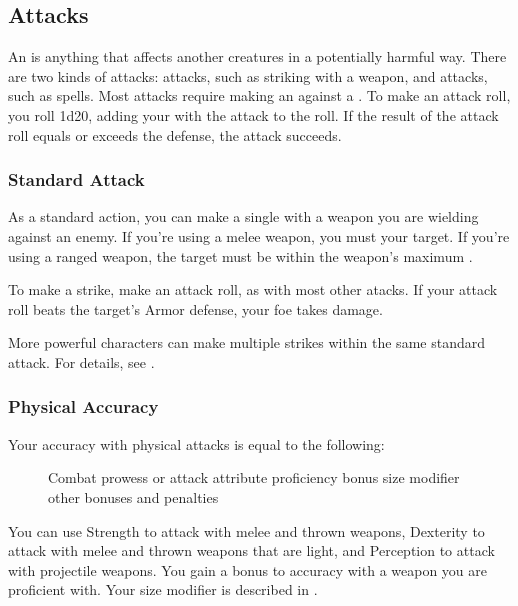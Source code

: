     \subsection{Attacks}\label{Attacks}
        An  is anything that affects another creatures in a potentially harmful way.
        There are two kinds of attacks:  attacks, such as striking with a weapon, and  attacks, such as spells.
        Most attacks require making an  against a .
        To make an attack roll, you roll 1d20, adding your  with the attack to the roll.
        If the result of the attack roll equals or exceeds the defense, the attack succeeds.

        \subsubsection{Standard Attack}\label{Standard Attack}
            As a standard action, you can make a single  with a weapon you are wielding against an enemy.
            If you're using a melee weapon, you must  your target.
            If you're using a ranged weapon, the target must be within the weapon's maximum .

            To make a strike, make an attack roll, as with most other atacks.
            If your attack roll beats the target's Armor defense, your foe takes damage.

            More powerful characters can make multiple strikes within the same standard attack.
            For details, see .

        \subsubsection{Physical Accuracy}\label{Physical Accuracy}
            Your accuracy with physical attacks is equal to the following:

            \begin{figure}[h]
                \centering Combat prowess or attack attribute \add proficiency bonus \add size modifier \add other bonuses and penalties
            \end{figure}

             You can use Strength to attack with melee and thrown weapons, Dexterity to attack with melee and thrown weapons that are light, and Perception to attack with projectile weapons.
             You gain a  bonus to accuracy with a weapon you are proficient with.
             Your size modifier is described in .

